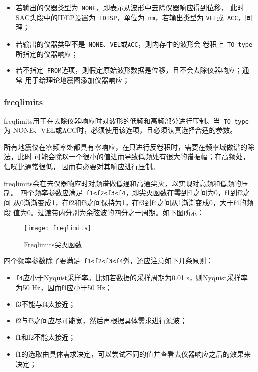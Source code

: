 \begin{itemize}
\item 若输出的仪器类型为~\verb+NONE+，即表示从波形中去除仪器响应得到位移，
    此时SAC头段中的IDEP设置为~\verb+IDISP+，单位为~\verb+nm+，若输出类型为
    \verb+VEL+或~\verb+ACC+，同理；
\item 若输出的仪器类型不是~\verb+NONE+、\verb+VEL+或\verb+ACC+，则内存中的波形会
    卷积上~\verb+TO type+所指定的仪器响应；
\item 若不指定~\verb+FROM+选项，则假定原始波形数据是位移，且不会去除仪器响应；通常
    用于给理论地震图添加仪器响应；
\end{itemize}

\subsubsection{freqlimits}
freqlimits用于在去除仪器响应时对波形的低频和高频部分进行压制。当~\verb+TO type+为
NONE、VEL或ACC时，必须使用该选项，且必须认真选择合适的参数。

所有地震仪在零频率处都具有零响应，在只进行反卷积时，需要在频率域做谱的除法，此时
可能会除以一个很小的值进而导致低频处有很大的谱振幅；在高频处，信噪比通常很低，
因而有必要对其响应进行压制。

freqlimits会在去仪器响应时对频谱做低通和高通尖灭，以实现对高频和低频的压制。
四个频率参数应满足~\verb+f1<f2<f3<f4+，即尖灭函数在零到f1之间为0，f1到f2之间
从0渐渐变成1，在f2和f3之间保持为1，在f3到f4之间从1渐渐变成0，大于f4的频段
值为0。过渡带内分别为余弦波的四分之一周期。如下图所示：

\begin{figure}[H]
\centering
\texttt{[image: freqlimits]}
\caption{Freqlimits尖灭函数}
\label{fig:freqlimits}
\end{figure}

四个频率参数除了要满足~\verb+f1<f2<f3<f4+外，还应注意如下几条原则：
\begin{itemize}
\item \verb+f4+应小于Nyquist采样率。比如若数据的采样周期为0.01 s，则Nyquist采样率
    为50 Hz，因而f4应小于50 Hz；
\item f3不能与f4太接近；
\item f2与f3之间应尽可能宽，然后再根据具体需求进行滤波；
\item f1和f2不能太接近；
\item f1的选取由具体需求决定，可以尝试不同的值并查看去仪器响应之后的效果来决定；
\end{itemize}

